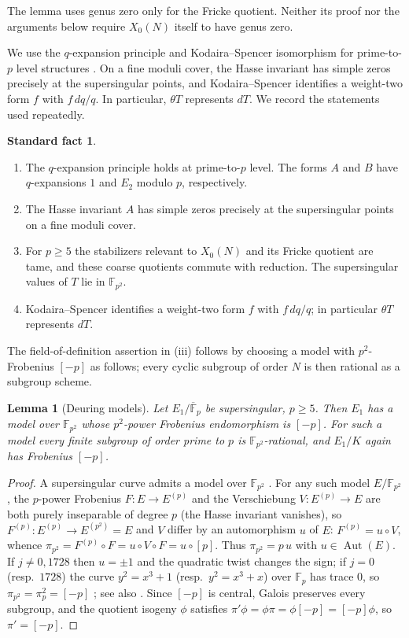 \documentclass[11pt,a4paper]{article}
\numberwithin{equation}{section}
\newtheorem{lemma}[theorem]{Lemma}
\theoremstyle{definition}
\newtheorem{fact}{Standard fact}
\theoremstyle{remark}
\newcommand{\Fp}{\mathbb F_p}
\newcommand{\Fq}{\mathbb F_{p^2}}
\newcommand{\Fb}{\overline{\mathbb F}_p}
\newcommand{\Aut}{\operatorname{Aut}}
\begin{document}
The lemma uses genus zero only for the Fricke quotient. Neither its
proof nor the arguments below require $X_0(N)$ itself to have genus zero.


We use the $q$-expansion principle and Kodaira--Spencer isomorphism for prime-to-$p$
level structures \citep{Katz73,KM85,Gross90}. On a fine moduli cover, the Hasse invariant
has simple zeros precisely at the supersingular points, and Kodaira--Spencer identifies
a weight-two form $f$ with $f\,dq/q$. In particular, $\theta T$ represents $dT$.
We record the statements used repeatedly.
\begin{fact}\label{fact:modp}
\begin{enumerate}[label=\textup{(\roman*)}]
\item The $q$-expansion principle holds at prime-to-$p$ level. The forms
$A$ and $B$ have $q$-expansions $1$ and $E_2$ modulo $p$, respectively.
\item The Hasse invariant $A$ has simple zeros precisely at the
supersingular points on a fine moduli cover.
\item For $p\ge5$ the stabilizers relevant to $X_0(N)$ and its Fricke
quotient are tame, and these coarse quotients commute with reduction.
The supersingular values of $T$ lie in $\Fq$.
\item Kodaira--Spencer identifies a weight-two form $f$ with
$f\,dq/q$; in particular $\theta T$ represents $dT$.
\end{enumerate}
\end{fact}
The field-of-definition assertion in (iii) follows by choosing a model
with $p^2$-Frobenius $[-p]$ as follows; every cyclic subgroup of order
$N$ is then rational as a subgroup scheme.

\begin{lemma}[Deuring models]\label{lem:deuring}
Let $E_1/\Fb$ be supersingular, $p\ge5$. Then $E_1$ has a model over $\Fq$ whose $p^2$-power
Frobenius endomorphism is $[-p]$. For such a model every finite subgroup of order prime to $p$ is
$\Fq$-rational, and $E_1/K$ again has Frobenius $[-p]$.
\end{lemma}
\begin{proof}
A supersingular curve admits a model over $\Fq$
\citep{Deuring41,Waterhouse69}. For any such model $E/\Fq$, the $p$-power Frobenius $F:E\to E^{(p)}$ and the
Verschiebung $V:E^{(p)}\to E$ are both purely inseparable of degree $p$ (the Hasse invariant
vanishes), so $F^{(p)}:E^{(p)}\to E^{(p^2)}=E$ and $V$ differ by an automorphism $u$ of $E$:
$F^{(p)}=u\circ V$, whence $\pi_{p^2}=F^{(p)}\circ F=u\circ V\circ F=u\circ[p]$. Thus
$\pi_{p^2}=p\,u$ with $u\in\Aut(E)$. If $j\ne0,1728$ then $u=\pm1$ and the quadratic twist changes
the sign; if $j=0$ (resp.\ $1728$) the curve $y^2=x^3+1$ (resp.\ $y^2=x^3+x$) over $\Fp$ has
trace $0$, so $\pi_{p^2}=\pi_p^2=[-p]$ \citep{Deuring41,Waterhouse69}; see also
\citet[Lemma~4.3]{Ono25}. Since $[-p]$ is central, Galois preserves every subgroup, and the quotient
isogeny $\phi$ satisfies $\pi'\phi=\phi\pi=\phi[-p]=[-p]\phi$, so $\pi'=[-p]$.
\end{proof}
\end{document}
